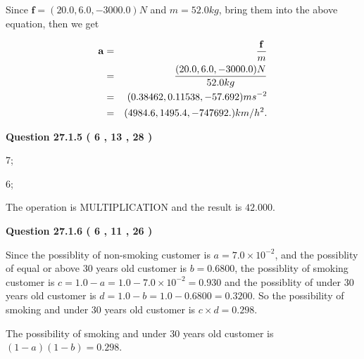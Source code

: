 \documentclass[12pt]{article}
\begin{document}
Since $\mathbf{f}=( %
20.0,  %
6.0,  %
-3000.0 )N$
and $m= %
52.0kg$, bring them into the above equation, then we get
 
\begin{eqnarray*}
\mathbf{a}&=&\frac{\mathbf{f}}m  \\
&=&\frac{(
20.0 ,
6.0 ,
-3000.0 )N
}{ %
52.0 kg}  \\
&=&(
0.38462 ,
0.11538,
-57.692
)ms^{-2} \\
&=&(
4984.6 ,
1495.4 ,
-747692.
)km/h^2.
\end{eqnarray*}
 
 
 
  
\vspace{0.2in}
  
{\textbf{\Large{Question
27.1.5 
 (           6 ,          13 ,          28 )
}}}
  
  
 
 
\noindent{}

7;
 
6;
 
The operation is  %
MULTIPLICATION and the result is
$ %
42.000$.
 
 
 
  
\vspace{0.2in}
  
{\textbf{\Large{Question
27.1.6 
 (           6 ,          11 ,          26 )
}}}
  
  
 
 
\noindent{}

Since the possiblity of  %
 non-smoking customer is $ a =  %
7.0 \times 10^{-2} $,
and the possiblity of  %
equal or above 30 years old customer is $ b =  %
0.6800 $,
the possiblity of  %
smoking customer is $ c = 1.0 - a = 1.0 -
7.0 \times 10^{-2}
=  %
0.930 $ and the possiblity of  %
under 30 years old
customer is $ d = 1.0 - b = 1.0 -  %
0.6800 =  %
0.3200  $.
So the possibility of  %
smoking and  %
under 30 years old
customer is $ c \times d =  %
0.298 $.
 
 
 
 
 
\noindent{}

The possibility of  %
smoking and  %
under 30 years old
customer is $ (1-a)(1-b) =  %
0.298 $.
 
 
   
\end{document}
